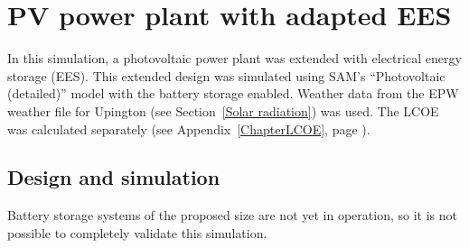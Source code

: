 \chapter{PV power plant with adapted EES}

In this simulation, a photovoltaic power plant was extended with electrical energy storage (EES). This extended design was simulated using SAM's \enquote{Photovoltaic (detailed)} model with the battery storage enabled. Weather data from the EPW weather file for Upington (see Section~\ref{Solar radiation}) was used. The LCOE was calculated separately (see Appendix~\ref{ChapterLCOE}, page \pageref{ChapterLCOE}).

\section{Design and simulation} \label{section PV system}
Battery storage systems of the proposed size are not yet in operation, so it is not possible to completely validate this simulation.


